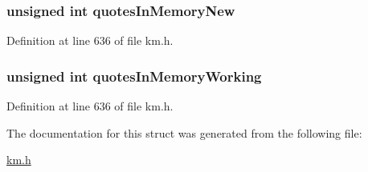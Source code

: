 \subsubsection[{\texorpdfstring{quotes\+In\+Memory\+New}{quotesInMemoryNew}}]{\setlength{\rightskip}{0pt plus 5cm}unsigned int quotes\+In\+Memory\+New}\hypertarget{struct_k_1_1m_quote_status_a28f5330130eff801278c9e5ed7e9d206}{}\label{struct_k_1_1m_quote_status_a28f5330130eff801278c9e5ed7e9d206}


Definition at line 636 of file km.\+h.

\subsubsection[{\texorpdfstring{quotes\+In\+Memory\+Working}{quotesInMemoryWorking}}]{\setlength{\rightskip}{0pt plus 5cm}unsigned int quotes\+In\+Memory\+Working}\hypertarget{struct_k_1_1m_quote_status_a806fde35f6fa8e059f8d35ab6621de2c}{}\label{struct_k_1_1m_quote_status_a806fde35f6fa8e059f8d35ab6621de2c}


Definition at line 636 of file km.\+h.



The documentation for this struct was generated from the following file\+:\begin{DoxyCompactItemize}
\item 
\hyperlink{km_8h}{km.\+h}\end{DoxyCompactItemize}
